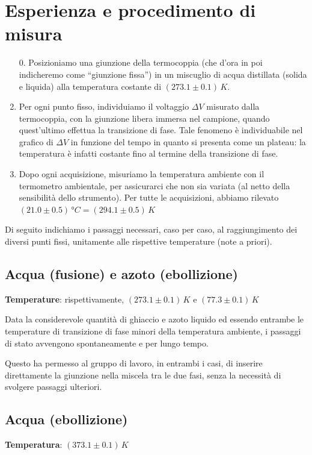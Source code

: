 \documentclass{article}
\begin{document}
\pagebreak
\section{Esperienza e procedimento di misura}

\begin{enumerate}
  \item[0.]
    Posizioniamo una giunzione della termocoppia (che d'ora in poi indicheremo
    come “giunzione fissa”) in un miscuglio %
    di acqua distillata (solida e liquida) alla temperatura
    costante di $(273.1\pm0.1)\,\unit{K}$.
  \item
    Per ogni punto fisso, individuiamo il voltaggio $\Delta V$ misurato dalla
    termocoppia, con la giunzione libera immersa nel campione,
    quando quest'ultimo effettua la transizione
    di fase. Tale fenomeno è individuabile nel grafico di $\Delta V$ in funzione
    del tempo in quanto si presenta come un plateau: la temperatura è infatti
    costante fino al termine della transizione di fase.
  \item
    Dopo ogni acquisizione, misuriamo la temperatura ambiente con il termometro
    ambientale, per assicurarci che non sia variata (al netto della sensibilità
    dello strumento). Per tutte le acquisizioni, abbiamo rilevato
    $(21.0\pm0.5)\,\unit{\degree C} = (294.1\pm0.5)\,\unit{K}$
\end{enumerate}
Di seguito indichiamo i passaggi necessari, caso per caso,
al raggiungimento dei diversi punti fissi, unitamente alle
rispettive temperature (note a priori).

\subsection*{Acqua (fusione) e azoto (ebollizione)}
\textbf{Temperature}: rispettivamente, $(273.1\pm0.1)\,\unit{K}$ e $(77.3\pm0.1)\,\unit{K}$
\vspace{1mm}

Data la considerevole quantità di ghiaccio e azoto liquido ed essendo
entrambe le temperature di transizione di fase minori della temperatura
ambiente, i passaggi di stato avvengono spontaneamente e per lungo tempo.

Questo ha permesso al gruppo di lavoro, in entrambi i casi,
di inserire direttamente la giunzione nella miscela tra le due fasi,
senza la necessità di svolgere passaggi ulteriori.

\subsection*{Acqua (ebollizione)}
\textbf{Temperatura}: $(373.1\pm0.1)\,\unit{K}$
\vspace{1mm}
\end{document}
